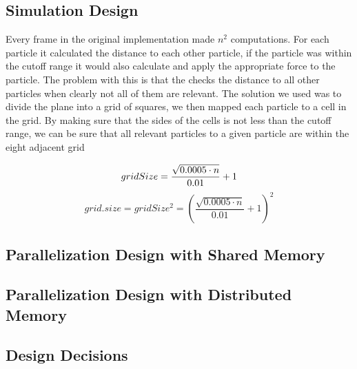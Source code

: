 
    \subsection{Simulation Design}

        Every frame in the original implementation made $n^2$ computations. For
        each particle it calculated the distance to each other particle, if the
        particle was within the cutoff range it would also calculate and apply
        the appropriate force to the particle. The problem with this is that the
        checks the distance to all other particles when clearly not all of them
        are relevant. The solution we used was to divide the plane into a grid
        of squares, we then mapped each particle to a cell in the grid. By
        making sure that the sides of the cells is not less than the cutoff
        range, we can be sure that all relevant particles to a given particle
        are within the eight adjacent grid 


        \begin{equation}
            gridSize = \frac{\sqrt{0.0005 \cdot n}}{0.01} + 1 \\
        \end{equation}
        \begin{equation}
            grid.size = gridSize^2 = \left(\frac{\sqrt{0.0005 \cdot n}}{0.01} + 1\right)^2
        \end{equation}

    \subsection{Parallelization Design with Shared Memory}%

    \subsection{Parallelization Design with Distributed Memory}%

    \subsection{Design Decisions}%
